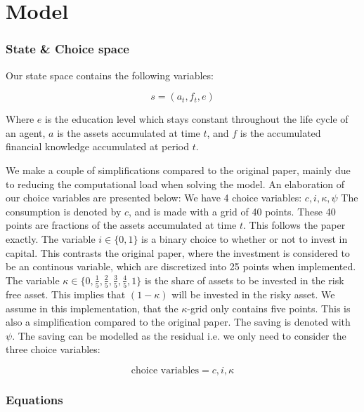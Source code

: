 \section{Model}

\subsubsection{State \& Choice space}\label{sec:stateandchoicespace}
Our state space contains the following variables:

\begin{equation}
    s = (a_t, f_t, e)
\end{equation}

Where $e$ is the education level which stays constant throughout the life cycle of an agent, $a$ is the assets accumulated at time $t$, and $f$ is the accumulated financial knowledge accumulated at period $t$.

We make a couple of simplifications compared to the original paper, mainly due to reducing the computational load when solving the model. An elaboration of our choice variables are presented below:
We have 4 choice variables: $ c, i, \kappa, \psi$ The consumption is denoted by $c$, and is made with a grid of 40 points. These 40 points are fractions of the assets accumulated at time $t$. This follows the paper exactly. The variable $i \in \{0, 1\}$ is a binary choice to whether or not to invest in capital. This contrasts the original paper, where the investment is considered to be an continous variable, which are discretized into 25 points when implemented. The variable $\kappa \in \{0, \frac{1}{5}, \frac{2}{5}, \frac{3}{5}, \frac{4}{5} , 1\}$ is the share of assets to be invested in the risk free asset. This implies that $(1 - \kappa)$ will be invested in the risky asset. We assume in this implementation, that the $\kappa$-grid only contains five points. This is also a simplification compared to the original paper. The saving is denoted with $\psi$. The saving can be modelled as the residual i.e. we only need to consider the three choice variables:

\begin{equation}
    \text{choice variables} = c, i, \kappa
\end{equation}

\subsubsection{Equations}

